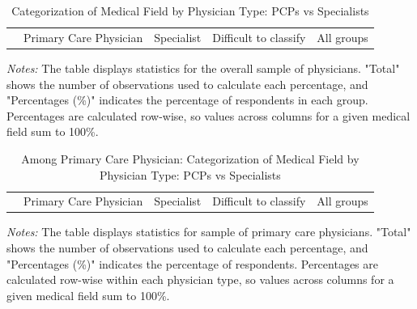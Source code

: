 \documentclass[11pt]{article}
\theoremstyle{definition}
\begin{document}
\begin{table}[H]
    \centering
    \caption{Categorization of Medical Field by Physician Type: PCPs vs Specialists}
    \begin{adjustbox}{width=0.75\linewidth} 
    \begin{tabular}{lccccccc}\toprule 
    & \multicolumn{2}{c}{Primary Care Physician} & \multicolumn{2}{c}{Specialist} & \multicolumn{2}{c}{Difficult to classify} & {All groups} \\
    \cmidrule(lr){2-3} \cmidrule(lr){4-5} \cmidrule(lr){6-7}  
    
    \end{tabular}
    \end{adjustbox}
    \label{tab:med_field_cat_phystype}
          {\parbox{1\linewidth}{           %
    		\scriptsize{{{ \textit{Notes:} The table displays statistics for the overall sample of physicians. "Total" shows the number of observations used to calculate each percentage, and "Percentages (\%)" indicates the percentage of respondents in each group. Percentages are calculated row-wise, so values across columns for a given medical field sum to 100\%.}}}}}
\end{table}

\begin{table}[H]
    \centering
    \caption{Among Primary Care Physician: Categorization of Medical Field by Physician Type: PCPs vs Specialists}
    \begin{adjustbox}{width=0.75\linewidth} 
    \begin{tabular}{lccccccc}\toprule & \multicolumn{2}{c}{Primary Care Physician} & \multicolumn{2}{c}{Specialist} & \multicolumn{2}{c}{Difficult to classify} & \multicolumn{1}{c}{All groups} \\ \cmidrule(lr){2-3} \cmidrule(lr){4-5} \cmidrule(lr){6-7}      
    
    \end{tabular}
    \end{adjustbox}
    \label{tab:med_field_cat_phystype_pc}
          {\parbox{1\linewidth}{           %
    		\scriptsize{{{ \textit{Notes:} The table displays statistics for sample of primary care physicians. "Total" shows the number of observations used to calculate each percentage, and "Percentages (\%)" indicates the percentage of respondents. Percentages are calculated row-wise within each physician type, so values across columns for a given medical field sum to 100\%.}}}}}
\end{table}
\end{document}
